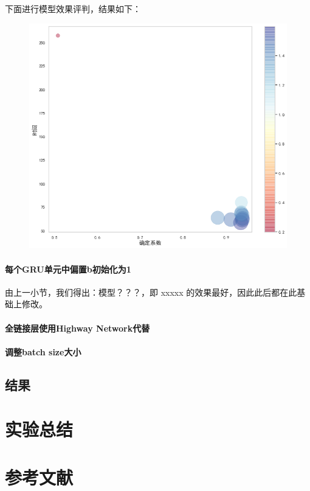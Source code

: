 \documentclass{jnuthesis}
\begin{document}
下面进行模型效果评判，结果如下：

\begin{figure}[H]
	\centering
	\includegraphics[width=0.5\linewidth,height=\textheight]{pic/screenshot014}
	\caption{}
	\label{fig:screenshot014}
\end{figure}




\subsubsection{每个GRU单元中偏置b初始化为1\cite{jozefowicz2015empirical}}

由上一小节，我们得出：模型？？？，即 xxxxx 的效果最好，因此此后都在此基础上修改。


\subsubsection{全链接层使用Highway Network代替\cite{srivastava2015highway}}




\subsubsection{调整batch size大小}

\section{结果}

\chapter{实验总结}


%
%
%
%
\chapter*{参考文献}


\end{document}

